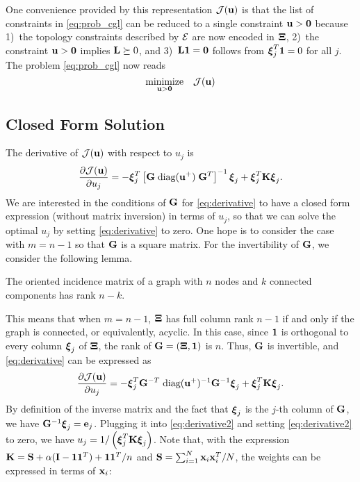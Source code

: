 \documentclass{article}
\begin{document}
One convenience provided by this representation ${\cal J}({\bf u})$ is that the list of constraints in \eqref{eq:prob_cgl} can be reduced to a single constraint ${\bf u}>{\bf 0}$ because 1)~the topology constraints described by ${\cal E}$ are now encoded in $\hbox{\boldmath$\Xi$}$, 2)~the constraint ${\bf u}>{\bf 0}$ implies ${\bf L}\succeq 0$, and 3)~${\bf L}{\bf 1}={\bf 0}$ follows from $\hbox{\boldmath$\xi$}_j^T{\bf 1}=0$ for all $j$. The problem \eqref{eq:prob_cgl} now reads
\[
  \underset{{\bf u}>{\bf 0}}{\text{minimize}} \quad {\cal J}({\bf u})
\]

\subsection{Closed Form Solution}
\label{sec:cf}
The derivative of ${\cal J}({\bf u})$ with respect to  $u_j$ is
\begin{equation}
\label{eq:derivative}
  \frac{\partial {\cal J}({\bf u})}{\partial u_j} = -\hbox{\boldmath$\xi$}_j^T\left[{\bf G}\;\text{diag}({\bf u}^+)\;{\bf G}^T\right]^{-1}\hbox{\boldmath$\xi$}_j + \hbox{\boldmath$\xi$}_j^T{\bf K}\hbox{\boldmath$\xi$}_j.
\end{equation}
We are interested in the conditions of ${\bf G}$ for \eqref{eq:derivative} to have a closed form expression (without matrix inversion) in terms of $u_j$, so that we can solve the optimal $u_j$ by setting \eqref{eq:derivative} to zero. One hope is to consider the case with $m=n-1$ so that ${\bf G}$ is a square matrix. For the invertibility of ${\bf G}$, we consider the following lemma. 
\begin{lemma}
  The oriented incidence matrix of a graph with $n$ nodes and $k$ connected components has rank $n-k$. 
\end{lemma}
This means that when $m=n-1$, $\hbox{\boldmath$\Xi$}$ has full column rank $n-1$ if and only if the graph is connected, or equivalently, acyclic. In this case, since ${\bf 1}$ is orthogonal to every column $\hbox{\boldmath$\xi$}_j$ of $\hbox{\boldmath$\Xi$}$, the rank of ${\bf G}=(\hbox{\boldmath$\Xi$},{\bf 1})$ is $n$. Thus, ${\bf G}$ is invertible, and \eqref{eq:derivative} can be expressed as 
\begin{equation}
\label{eq:derivative2}
  \frac{\partial {\cal J}({\bf u})}{\partial u_j} = -\hbox{\boldmath$\xi$}_j^T{\bf G}^{-T}\;\text{diag}({\bf u}^+)^{-1}{\bf G}^{-1}\hbox{\boldmath$\xi$}_j + \hbox{\boldmath$\xi$}_j^T{\bf K}\hbox{\boldmath$\xi$}_j.
\end{equation}
By definition of the inverse matrix and the fact that $\hbox{\boldmath$\xi$}_j$ is the $j$-th column of ${\bf G}$, we have ${\bf G}^{-1}\hbox{\boldmath$\xi$}_j={\bf e}_j$. Plugging it into \eqref{eq:derivative2} and setting \eqref{eq:derivative2} to zero, we have $u_j = 1/\left(\hbox{\boldmath$\xi$}_j^T{\bf K}\hbox{\boldmath$\xi$}_j\right)$. 
Note that, with the expression ${\bf K}={\bf S}+\alpha({\bf I}-{\bf 1}{\bf 1}^T)+{\bf 1}{\bf 1}^T/n$ and ${\bf S}=\sum_{i=1}^N{\bf x}_i{\bf x}_i^T/N$, the weights can be expressed in terms of ${\bf x}_i$:
\end{document}
